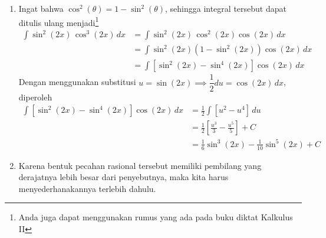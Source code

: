 \documentclass[11pt,openany,a4paper]{article}
\begin{document}
\begin{enumerate}
        \item Ingat bahwa $\cos^2(\theta) = 1 - \sin^2(\theta)$, sehingga integral tersebut dapat ditulis ulang menjadi\footnote{Anda juga dapat menggunakan rumus yang ada pada buku diktat Kalkulus II}
        \begin{align*}
          \int \sin^2(2x)\,\cos^3(2x)\,dx&= \int \sin^2(2x)\,\cos^2(2x) \cos(2x)\,dx \\
          &= \int \sin^2(2x)\left(1 - \sin^2(2x)\right)\cos(2x)\,dx\\
          &= \int \left[\sin^2(2x)-\sin^4(2x)\right]\cos(2x)\,dx
        \end{align*}
        Dengan menggunakan substitusi $u = \sin(2x)\implies \dfrac{1}{2}du= \cos(2x)\,dx$, diperoleh
        \begin{align*}
          \int \left[\sin^2(2x)-\sin^4(2x)\right]\cos(2x)\,dx &= \frac{1}{2}\int \left[u^2 - u^4\right]\,du \\
          &= \frac{1}{2}\left[\frac{u^3}{3} - \frac{u^5}{5}\right] + C \\
          &= \boxed{\frac{1}{6}\sin^3(2x) - \frac{1}{10}\sin^5(2x) + C}
        \end{align*}
        \item Karena bentuk pecahan rasional tersebut memiliki pembilang yang derajatnya lebih besar dari penyebutnya, maka kita harus menyederhanakannya terlebih dahulu. 
        

\end{enumerate}
\end{document}
